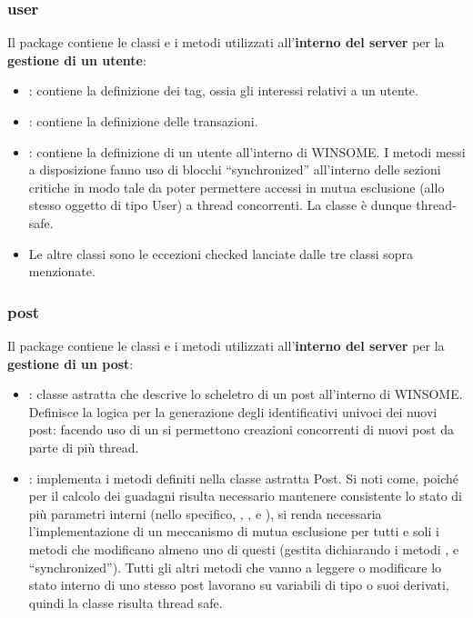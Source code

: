 \documentclass[11pt, italian, openany]{book}
\begin{document}
\begin{sloppypar}
\subsubsection*{user}
Il package contiene le classi e i metodi utilizzati all'\textbf{interno del server} per la \textbf{gestione di un utente}:
\begin{itemize}[itemsep=0pt, parsep=0pt, topsep=0pt]
	\item {}: contiene la definizione dei tag, ossia gli interessi relativi a un utente.
	\item {}: contiene la definizione delle transazioni.
	\item {}: contiene la definizione di un utente all'interno di WINSOME. I metodi messi a disposizione fanno uso di blocchi
	``synchronized'' all'interno delle sezioni critiche in modo tale da poter permettere accessi in mutua esclusione (allo stesso
	oggetto di tipo User) a thread concorrenti. La classe \`e dunque thread-safe.
	\item Le altre classi sono le eccezioni checked lanciate dalle tre classi sopra menzionate.
\end{itemize}

\subsubsection*{post}
Il package contiene le classi e i metodi utilizzati all'\textbf{interno del server} per la \textbf{gestione di un post}:
\begin{itemize}[itemsep=0pt, parsep=0pt, topsep=0pt]
	\item {}: classe astratta che descrive lo scheletro di un post all'interno di WINSOME. Definisce la logica per la generazione
	degli identificativi univoci dei nuovi post: facendo uso di un  si permettono creazioni concorrenti di
	nuovi post da parte di pi\`u thread.
	\item {}: implementa i metodi definiti nella classe astratta Post. Si noti come, poich\'e per il calcolo dei guadagni
	risulta necessario mantenere consistente lo stato di pi\`u parametri interni (nello specifico, , ,
	 e ), si renda necessaria l'implementazione di un meccanismo di mutua esclusione per tutti e
	soli i metodi che modificano almeno uno di questi (gestita dichiarando i metodi , 
	e  ``synchronized''). Tutti gli altri metodi che vanno a leggere o modificare lo stato interno di uno stesso post
	lavorano su variabili di tipo  o suoi derivati, quindi la classe risulta thread safe.
\end{itemize}


\end{sloppypar}
\end{document}
